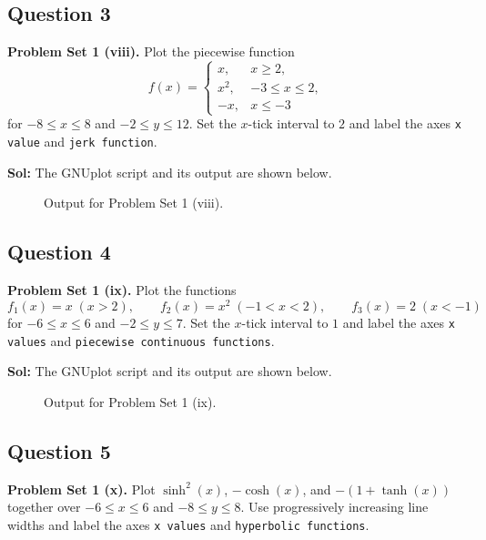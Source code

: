 \documentclass{book}
\begin{document}
\subsection*{Question 3}
\noindent\textbf{Problem Set 1 (viii).} Plot the piecewise function
\[
f(x)=\begin{cases}x,&x\ge2,\\x^2,&-3\le x\le2,\\-x,&x\le-3\end{cases}
\]
for $-8\le x\le8$ and $-2\le y\le12$. Set the $x$-tick interval to $2$ and label the axes \texttt{x value} and \texttt{jerk function}.

\noindent\textbf{Sol:} The GNUplot script and its output are shown below.

\begin{figure}[H]
    \centering
    
    \caption{Output for Problem Set 1 (viii).}
\end{figure}
\newpage

\subsection*{Question 4}
\noindent\textbf{Problem Set 1 (ix).} Plot the functions
\[
f_1(x)=x\;(x>2),\qquad f_2(x)=x^2\;(-1<x<2),\qquad f_3(x)=2\;(x<-1)
\]
for $-6\le x\le6$ and $-2\le y\le7$. Set the $x$-tick interval to $1$ and label the axes \texttt{x values} and \texttt{piecewise continuous functions}.

\noindent\textbf{Sol:} The GNUplot script and its output are shown below.

\begin{figure}[H]
    \centering
    
    \caption{Output for Problem Set 1 (ix).}
\end{figure}
\newpage

\subsection*{Question 5}
\noindent\textbf{Problem Set 1 (x).} Plot $\sinh^2(x)$, $-\cosh(x)$, and $-(1+\tanh(x))$ together over $-6\le x\le6$ and $-8\le y\le8$. Use progressively increasing line widths and label the axes \texttt{x values} and \texttt{hyperbolic functions}.
\end{document}
